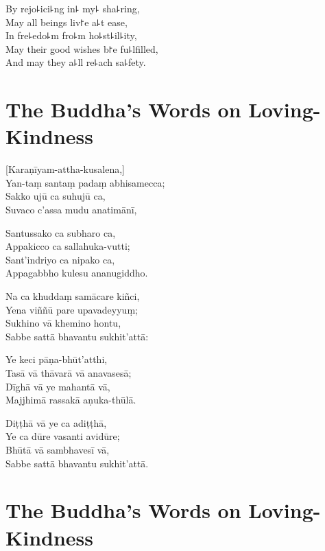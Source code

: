 \begin{english}
  By rejo꜕ici꜕ng in꜕ my꜕ sha꜕ring,\\
  May all beings liv꜓e a꜕t ease,\\
  In fre꜕edo꜕m fro꜕m ho꜕st꜕il꜕ity,\\
  May their good wishes b꜓e fu꜕lfilled,\\
  And may they a꜕ll re꜕ach sa꜕fety.
\end{english}

\chapter*[Loving-Kindness]{The Buddha's Words on Loving-Kindness}%

\delegateSetUseNext


\begin{leader}
\end{leader}

[Karaṇīyam-attha-kusalena,]\\
Yan-taṃ santaṃ padaṃ abhisamecca;\\
Sakko ujū ca suhujū ca,\\
Suvaco c'assa mudu anatimānī,

Santussako ca subharo ca,\\
Appakicco ca sallahuka-vutti;\\
Sant'indriyo ca nipako ca,\\
Appagabbho kulesu ananugiddho.

Na ca khuddaṃ samācare kiñci,\\
Yena viññū pare upavadeyyuṃ;\\
Sukhino vā khemino hontu,\\
Sabbe sattā bhavantu sukhit'attā:

Ye keci pāṇa-bhūt'atthi,\\
Tasā vā thāvarā vā anavasesā;\\
Dīghā vā ye mahantā vā,\\
Majjhimā rassakā aṇuka-thūlā.

Diṭṭhā vā ye ca adiṭṭhā,\\
Ye ca dūre vasanti avidūre;\\
Bhūtā vā sambhavesī vā,\\
Sabbe sattā bhavantu sukhit'attā.

\chapter[Loving-Kindness]{The Buddha's Words on Loving-Kindness}%

